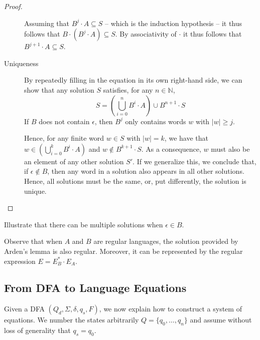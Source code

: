 \begin{proof}
\begin{description}
{    Assuming that $B^{j} \cdot A \subseteq S$ -- which is the induction hypothesis -- it thus follows that 
    $B \cdot (B^j \cdot A) \subseteq S$. By associativity of $\cdot$ it thus follows that
    $B^{j+1} \cdot A \subseteq S$.\vspace{1em}
}

\item[Uniqueness]

   By repeatedly filling in the equation in its own right-hand side, we can show that any solution $S$ satisfies,
   for any $n \in \mathbb{N}$,
   \begin{equation*}
   S = \left(\bigcup_{i = 0}^n B^i \cdot A\right) \cup B^{n+1} \cdot S
   \end{equation*}
   If $B$ does not contain $\epsilon$, then $B^j$ only contains words $w$ with $|w| \geq j$.

   Hence, for any finite word $w \in S$ with $|w| = k$, we have that $w \in (\bigcup_{i = 0}^k B^i \cdot A)$
   and $w \not\in B^{k+1} \cdot S$. As a consequence, $w$ must also be an element of any other solution $S'$.
   If we generalize this, we conclude that, if $\epsilon \not\in B$, then any word in a solution also appears
   in all other solutions. Hence, all solutions must be the same, or, put differently, the solution is unique.\vspace{-2em}
\end{description}
\end{proof}

\begin{exercise}
Illustrate that there can be multiple solutions when $\epsilon \in B$. 
\end{exercise}


Observe that when $A$ and $B$ are regular languages, the solution provided by Arden's lemma is
also regular. Moreover, it can be represented by the regular expression $E = E_B^* \cdot E_A$.

\subsection{From DFA to Language Equations}

Given a DFA $(Q_d,\Sigma,\delta,q_{s},F)$, we now explain how to construct a system of equations.
We number the states arbitrarily $Q = \{ q_0, \ldots, q_n\}$ and assume without loss of generality
that $q_s = q_0$.

